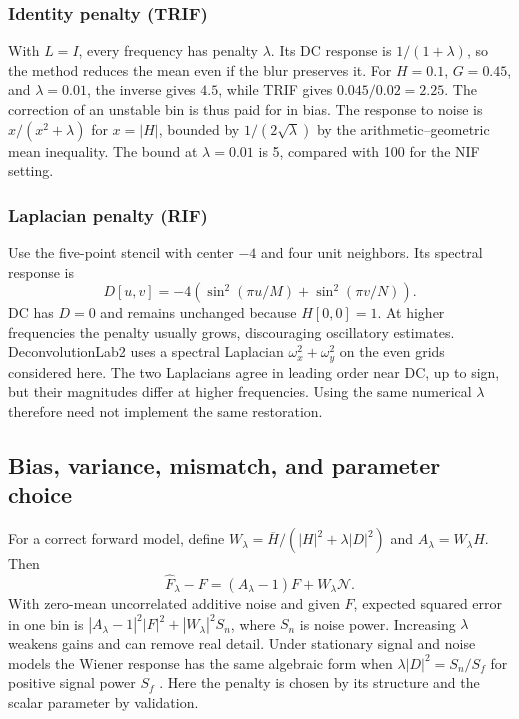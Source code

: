 \subsubsection{Identity penalty (TRIF)}

With \(L=I\), every frequency has penalty \(\lambda\). Its DC response is \(1/(1+\lambda)\), so the method reduces the mean even if the blur preserves it. For \(H=0.1\), \(G=0.45\), and \(\lambda=0.01\), the inverse gives \(4.5\), while TRIF gives \(0.045/0.02=2.25\). The correction of an unstable bin is thus paid for in bias. The response to noise is \(x/(x^2+\lambda)\) for \(x=|H|\), bounded by \(1/(2\sqrt{\lambda})\) by the arithmetic--geometric mean inequality. The bound at \(\lambda=0.01\) is 5, compared with 100 for the NIF setting.

\subsubsection{Laplacian penalty (RIF)}

Use the five-point stencil with center \(-4\) and four unit neighbors. Its spectral response is
\begin{equation}
D[u,v]=-4\left(\sin^2(\pi u/M)+\sin^2(\pi v/N)\right).
\label{eq:laplacian}
\end{equation}
DC has \(D=0\) and remains unchanged because \(H[0,0]=1\). At higher frequencies the penalty usually grows, discouraging oscillatory estimates. DeconvolutionLab2 uses a spectral Laplacian \(\omega_x^2+\omega_y^2\) on the even grids considered here. The two Laplacians agree in leading order near DC, up to sign, but their magnitudes differ at higher frequencies. Using the same numerical \(\lambda\) therefore need not implement the same restoration.

\subsection{Bias, variance, mismatch, and parameter choice}

For a correct forward model, define \(W_\lambda=\overline H/(|H|^2+\lambda |D|^2)\) and \(A_\lambda=W_\lambda H\). Then
\begin{equation}
\widehat F_\lambda-F=(A_\lambda-1)F+W_\lambda\mathcal N .
\label{eq:bias}
\end{equation}
With zero-mean uncorrelated additive noise and given \(F\), expected squared error in one bin is
\(|A_\lambda-1|^2|F|^2+|W_\lambda|^2 S_n\), where \(S_n\) is noise power. Increasing \(\lambda\) weakens gains and can remove real detail. Under stationary signal and noise models the Wiener response has the same algebraic form when \(\lambda |D|^2=S_n/S_f\) for positive signal power \(S_f\) \citep{hansen,sage}. Here the penalty is chosen by its structure and the scalar parameter by validation.

